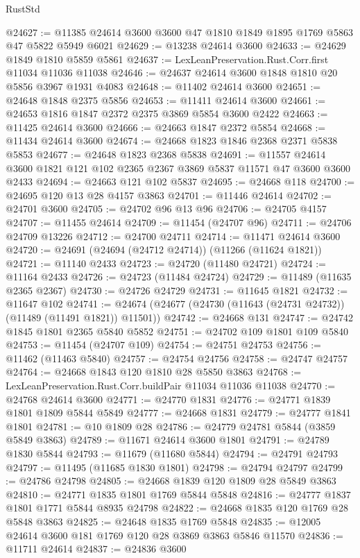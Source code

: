 \begin{lexlean}{RustStd}
\begin{coremodule}
@24627 := @11385 @24614 @3600 @3600 @47 @1810 @1849 @1895 @1769 @5863 @47 @5822 @5949 @6021
@24629 := @13238 @24614 @3600
@24633 := @24629 @1849 @1810 @5859 @5861
@24637 := LexLeanPreservation.Rust.Corr.first @11034 @11036 @11038
@24646 := @24637 @24614 @3600 @1848 @1810 @20 @5856 @3967 @1931 @4083
@24648 := @11402 @24614 @3600
@24651 := @24648 @1848 @2375 @5856
@24653 := @11411 @24614 @3600
@24661 := @24653 @1816 @1847 @2372 @2375 @3869 @5854 @3600 @2422
@24663 := @11425 @24614 @3600
@24666 := @24663 @1847 @2372 @5854
@24668 := @11434 @24614 @3600
@24674 := @24668 @1823 @1846 @2368 @2371 @5838 @5853
@24677 := @24648 @1823 @2368 @5838
@24691 := @11557 @24614 @3600 @1821 @121 @102 @2365 @2367 @3869 @5837 @11571 @47 @3600 @3600 @2433
@24694 := @24663 @121 @102 @5837
@24695 := @24668 @118
@24700 := @24695 @120 @13 @28 @4157 @3863
@24701 := @11446 @24614
@24702 := @24701 @3600
@24705 := @24702 @96 @13 @96
@24706 := @24705 @4157
@24707 := @11455 @24614
@24709 := @11454 (@24707 @96)
@24711 := @24706 @24709 @13226
@24712 := @24700 @24711
@24714 := @11471 @24614 @3600
@24720 := @24691 (@24694 (@24712 @24714)) (@11266 (@11624 @1821))
@24721 := @11140 @2433
@24723 := @24720 (@11480 @24721)
@24724 := @11164 @2433
@24726 := @24723 (@11484 @24724)
@24729 := @11489 (@11635 @2365 @2367)
@24730 := @24726 @24729
@24731 := @11645 @1821
@24732 := @11647 @102
@24741 := @24674 (@24677 (@24730 (@11643 (@24731 @24732)) (@11489 (@11491 @1821)) @11501))
@24742 := @24668 @131
@24747 := @24742 @1845 @1801 @2365 @5840 @5852
@24751 := @24702 @109 @1801 @109 @5840
@24753 := @11454 (@24707 @109)
@24754 := @24751 @24753
@24756 := @11462 (@11463 @5840)
@24757 := @24754 @24756
@24758 := @24747 @24757
@24764 := @24668 @1843 @120 @1810 @28 @5850 @3863
@24768 := LexLeanPreservation.Rust.Corr.buildPair @11034 @11036 @11038
@24770 := @24768 @24614 @3600
@24771 := @24770 @1831
@24776 := @24771 @1839 @1801 @1809 @5844 @5849
@24777 := @24668 @1831
@24779 := @24777 @1841 @1801
@24781 := @10 @1809 @28
@24786 := @24779 @24781 @5844 (@3859 @5849 @3863)
@24789 := @11671 @24614 @3600 @1801
@24791 := @24789 @1830 @5844
@24793 := @11679 (@11680 @5844)
@24794 := @24791 @24793
@24797 := @11495 (@11685 @1830 @1801)
@24798 := @24794 @24797
@24799 := @24786 @24798
@24805 := @24668 @1839 @120 @1809 @28 @5849 @3863
@24810 := @24771 @1835 @1801 @1769 @5844 @5848
@24816 := @24777 @1837 @1801 @1771 @5844 @8935 @24798
@24822 := @24668 @1835 @120 @1769 @28 @5848 @3863
@24825 := @24648 @1835 @1769 @5848
@24835 := @12005 @24614 @3600 @181 @1769 @120 @28 @3869 @3863 @5846 @11570
@24836 := @11711 @24614
@24837 := @24836 @3600

\end{coremodule}
\end{lexlean}
